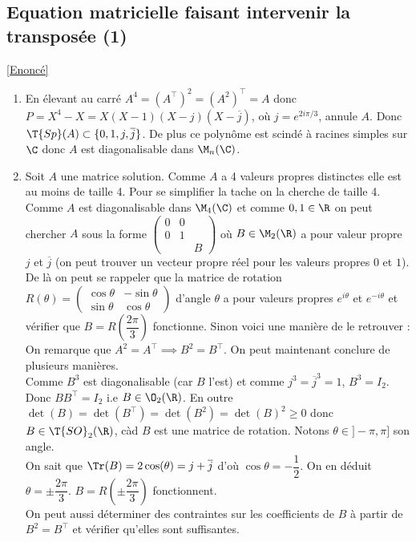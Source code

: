 \documentclass[8pt]{book}
\begin{document}
	\subsection{Equation matricielle faisant intervenir la transposée (1) }
	\label{Equation matricielle faisant intervenir la transposée (1) corrigé}
	\textcolor{blue}{\hyperref[Equation matricielle faisant intervenir la transposée (1)]{[Enoncé]}}\\
	\begin{enumerate}[leftmargin=*]
		\item En élevant au carré $A^4=(A^\top)^2=(A^2)^\top=A$ donc $P=X^4-X=X(X-1)(X-j)(X-\overline j)$, où $j=e^{2i\pi/3}$, annule $A$. Donc $\T{Sp}(A)\subset \{0,1,j,\overline j\}$. De plus ce polynôme est scindé à racines simples sur $\C$ donc $A$ est diagonalisable dans $\M_n(\C)$.
		\item Soit $A$ une matrice solution. Comme $A$ a 4 valeurs propres distinctes elle est au moins de taille 4. Pour se simplifier la tache on la cherche de taille 4.\\
		Comme $A$ est diagonalisable dans $\M_4(\C)$ et comme $0,1\in \R$ on peut chercher $A$ sous la forme $\begin{pmatrix}
			0&0&\\
			0&1&\\
			&&B
		\end{pmatrix}$ où $B\in \M_2(\R)$ a pour valeur propre $j$ et $\overline j$ (on peut trouver un vecteur propre réel pour les valeurs propres $0$ et $1$).\\
		De là on peut se rappeler que la matrice de rotation $R(\theta)=\begin{pmatrix}
			\cos\theta&-\sin\theta\\
			\sin\theta&\cos\theta
		\end{pmatrix}$ d'angle $\theta$ a pour valeurs propres $e^{i\theta}$ et $e^{-i\theta}$ et vérifier que $B=R\left(\dfrac{2\pi}{3}\right)$ fonctionne. Sinon voici une manière de le retrouver :\\
		On remarque que $A^2=A^\top\implies B^2=B^\top$. On peut maintenant conclure de plusieurs manières.\\
		Comme $B^3$ est diagonalisable (car $B$ l'est) et comme $j^3=\overline j^3=1$, $B^3=I_2$. Donc $BB^\top=I_2$ i.e $B\in \O_2(\R)$. En outre $\det(B)=\det(B^\top)=\det(B^2)=\det(B)^2\geq 0$ donc $B\in \T{SO}_2(\R)$, càd $B$ est une matrice de rotation. Notons $\theta\in ]-\pi,\pi]$ son angle.\\
		On sait que $\Tr(B)=2\cos(\theta)=j+\overline j$ d'où $\cos\theta=-\dfrac{1}{2}$. On en déduit $\theta=\pm\dfrac{2\pi}{3}$. $B=R\left(\pm\dfrac{2\pi}{3}\right)$ fonctionnent.\\
		On peut aussi déterminer des contraintes sur les coefficients de $B$ à partir de $B^2=B^\top$ et vérifier qu'elles sont suffisantes.
	\end{enumerate}
	
\end{document}
